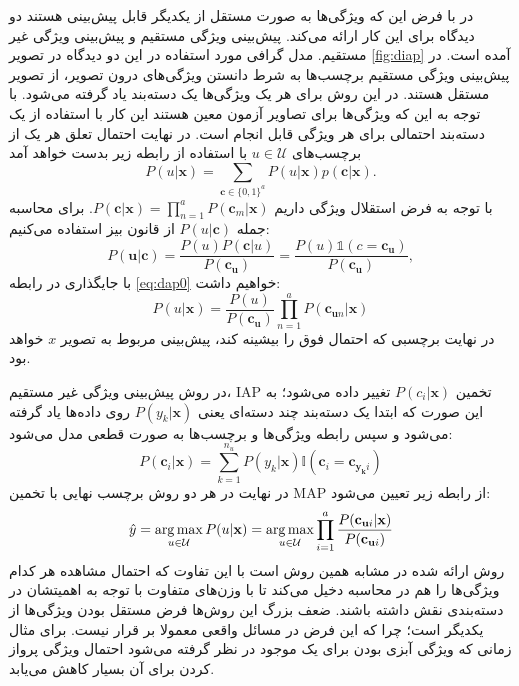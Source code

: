 در
\cite{lampert09}
با فرض این که ویژگی‌ها به صورت مستقل از یکدیگر قابل پیش‌بینی هستند دو دیدگاه برای این کار ارائه می‌کند. پیش‌بینی ویژگی مستقیم
و پیش‌بینی ویژگی غیر مستقیم.
 مدل گرافی مورد استفاده در این دو دیدگاه در تصویر \ref{fig:diap} آمده است. در پیش‌بینی ویژگی مستقیم برچسب‌ها به شرط دانستن ویژگی‌های درون تصویر، از تصویر مستقل هستند. در این روش برای هر یک ویژگی‌ها یک دسته‌بند یاد گرفته می‌شود. با توجه به این که ویژگی‌ها برای تصاویر آزمون معین هستند این کار با استفاده از یک دسته‌بند احتمالی برای هر ویژگی قابل انجام است. در نهایت احتمال تعلق هر یک از برچسب‌های
$ u \in \mathcal{U} $
با استفاده از رابطه زیر بدست خواهد آمد
\begin{equation} \label{eq:dap0}
  P(u | \mathbf{x}  ) = \sum_{\mathbf{c} \in \{0,1\}^a} P(u | \mathbf{x} ) p(\mathbf{c} |\mathbf{x} ).
\end{equation}
با توجه به فرض استقلال ویژگی داریم
$P(\mathbf{c} |\mathbf{x} ) = \prod_{n=1}^a P(\mathbf{c} _m |\mathbf{x} )$.
برای محاسبه جمله 
$P(u | \mathbf{c} )$ 
از قانون بیز استفاده می‌کنیم:
\[
P(\mathbf{u}  | \mathbf{c} ) = \frac{P(u)P(\mathbf{c} |u)}{P(\mathbf{c_u} )}  = \frac {P(u) \mathds{1}(c= \mathbf{c_u} )} {P(\mathbf{c_u} )},
\]
با جایگذاری در رابطه \eqref{eq:dap0} خواهیم داشت:
\begin{equation}
  P(u | \mathbf{x}  ) = \frac{P(u)}{P(\mathbf{c_u} )} \prod_{n=1}^a P(\mathbf{c}_{\mathbf{u} n}|\mathbf{x} )
\end{equation}
در نهایت برچسبی که احتمال فوق را بیشینه کند، پیش‌بینی مربوط به تصویر $x$ خواهد بود.

در روش پیش‌بینی ویژگی غیر مستقیم، IAP
 تخمین  $P(c_i|\mathbf{x}) $ تغییر داده می‌شود؛ به این صورت که ابتدا یک دسته‌بند چند دسته‌ای یعنی $P(y_k |\mathbf{x})$ روی داده‌ها یاد گرفته می‌شود و سپس رابطه ویژگی‌ها و برچسب‌ها به صورت قطعی مدل می‌شود:
\begin{equation}
P(\mathbf{c}_i | \mathbf{x}) = \sum_{k=1}^{n_u} P(y_k | \mathbf{x}) \mathbb{I}(\mathbf{c}_i = \mathbf{c}_{\mathbf{y_k}i})
\end{equation}
در نهایت در هر دو روش برچسب نهایی با تخمین MAP
از رابطه زیر تعیین می‌شود:
\begin{equation}
\hat{y} = \operatorname*{arg\,max}_{u \in \mathcal{U}} P(u|\mathbf{x}) =  \operatorname*{arg\,max}_{u \in \mathcal{U}} \prod_{i=1}^a \frac{P(\mathbf{c}_{\mathbf{u}i} | \mathbf{x})}{P(\mathbf{c}_{\mathbf{u}i})}
\end{equation}
روش ارائه شده در
\cite{suzuki14}
مشابه همین روش است با این تفاوت که احتمال مشاهده هر کدام ویژگی‌ها را هم در محاسبه دخیل می‌کند تا با وزن‌های متفاوت با توجه به اهمیتشان در دسته‌بندی نقش داشته باشند. ضعف بزرگ این روش‌ها فرض مستقل بودن ویژگی‌ها از یکدیگر است؛ چرا که این فرض در مسائل واقعی معمولا بر قرار نیست. برای مثال زمانی که ویژگی آبزی بودن برای یک موجود در نظر گرفته می‌شود احتمال ویژگی پرواز کردن برای آن بسیار کاهش می‌یابد.
